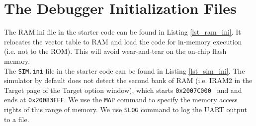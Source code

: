 \chapter{The Debugger Initialization Files}
\label{app_debug_ini}

The RAM.ini file in the starter code can be found in Listing \ref{lst_ram_ini}. It relocates the vector table to RAM and load the code for in-memory execution (i.e. not to the ROM). This will avoid wear-and-tear on the on-chip flash memory. \\



The \verb+SIM.ini+ file in the starter code can be found in Listing \ref{lst_sim_ini}. The simulator by default does not detect the second bank of RAM (i.e. IRAM2 in the Target page of the Target option window), which starts \verb+0x2007C000 + and and ends at \verb+0x20083FFF+. We use the \verb+MAP+ command to specify the memory access rights of this range of memory. We use \verb+SLOG+ command to log the UART output to a file. \\ 
\pagebreak




